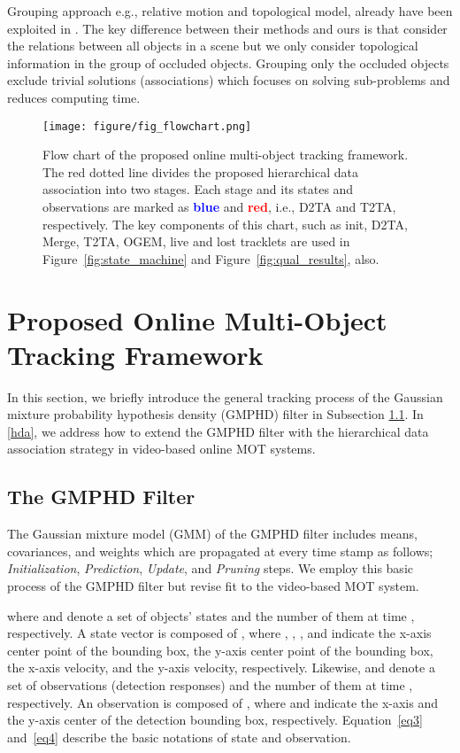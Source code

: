 \documentclass[journal]{IEEEtran}
\newcounter{ct}
\begin{document}
Grouping approach e.g., relative motion and topological model, already have been exploited in \cite{rmot,scea}. The key difference between their methods and ours is that \cite{rmot,scea} consider the relations between all objects in a scene but we only consider topological information in the group of occluded objects.
Grouping only the occluded objects exclude trivial solutions (associations) which focuses on solving sub-problems and reduces computing time.

\begin{figure*}
\centering
\texttt{[image: figure/fig\_flowchart.png]}
\caption{Flow chart of the proposed online multi-object tracking framework. The red dotted line divides the proposed hierarchical data association into two stages. Each stage and its states and observations are marked as \textbf{\textcolor{blue}{blue}} and \textbf{\textcolor{red}{red}}, i.e., D2TA and T2TA, respectively. The key components of this chart, such as init, D2TA, Merge, T2TA, OGEM, live and lost tracklets are used in Figure~\ref{fig:state_machine} and Figure~\ref{fig:qual_results}, also.}
\label{fig:framework}
\end{figure*}

\section{Proposed Online Multi-Object Tracking Framework}
\label{Framework}

In this section, we briefly introduce the general tracking process of the Gaussian mixture probability hypothesis density (GMPHD) filter in Subsection \ref{subsec:gmphd}. In \ref{hda}, we address how to extend the GMPHD filter with the hierarchical data association strategy in video-based online MOT systems. 
\subsection{The GMPHD Filter}
\label{subsec:gmphd}
The Gaussian mixture model (GMM) of the GMPHD filter includes means, covariances, and weights which are propagated at every time stamp as follows; \textit{Initialization}, \textit{Prediction}, \textit{Update}, and \textit{Pruning} steps.
We employ this basic process of the GMPHD filter but revise fit to the video-based MOT system.


where  and  denote a set of objects' states and the number of them at time , respectively. A state vector  is composed of , where , , , and  indicate the x-axis center point of the bounding box, the y-axis center point of the bounding box, the x-axis velocity, and the y-axis velocity, respectively. Likewise,  and  denote a set of observations (detection responses) and the number of them at time , respectively. An observation  is composed of , where  and  indicate the x-axis and the y-axis center of the detection bounding box, respectively. 
Equation~\eqref{eq3} and~\eqref{eq4} describe the basic notations of state and observation.
\end{document}
